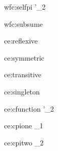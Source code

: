 \documentclass{article}
\theoremstyle{break}
\begin{document}
  {wfc:selfpi}
  {\validconstructor{\context}{\constructor}
                       {}\qquad
                       {\capply{\constructor}{\cvar}}{\kind'_2}}
  {\validconstructor{\context}{\constructor}
                       {}}

  {wfc:subsume}
  {\validconstructor{\context}{\constructor}{\kind}\qquad
     }
  {}

  {}

  {ce:reflexive}
  {\validconstructor{\context}{\constructor}{\kind}}
  {\equivconstructor{\context}{\constructor}{\constructor}{\kind}}

  {ce:symmetric}
  {}
  {}

  {ce:transitive}
  {\qquad
   }
  {}

  {ce:singleton}
  {\validconstructor{\context}{\constructor}
     {}}
  {}

  {ce:cfunction}
  {\qquad
     {\constructor}{\constructor'}{\kind_2}}
  {\equivconstructor{\context}
     {}
     {}
     {}}

  {ce:cpione}
  {
     {}}
  {\equivconstructor{\context}
     {}{}{\kind_1}}

  {ce:cpitwo}
  {
     {}}
  {\equivconstructor{\context}
     {}{}
     {\kind_2}}
\end{document}
